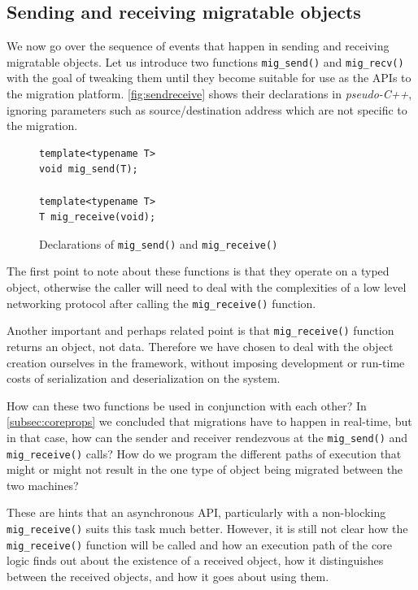 \subsection{Sending and receiving migratable objects}
\label{subsec:sendrecmig}

We now go over the sequence of events that happen in sending and
receiving migratable objects. Let us introduce two functions
\texttt{mig\_send()} and \texttt{mig\_recv()} with
the goal of tweaking them until they become suitable for use as the APIs
to the migration platform. \autoref{fig:sendreceive} shows their
declarations in \emph{pseudo-C++}, ignoring parameters such as
source/destination address which are not specific to the migration.

\begin{figure}[t]
\begin{lstlisting}
template<typename T>
void mig_send(T);

template<typename T>
T mig_receive(void);
\end{lstlisting}
\caption{
    Declarations of \texttt{mig\_send()} and \texttt{mig\_receive()}
}
\label{fig:sendreceive}
\end{figure}

The first point to note about these functions is that they operate on
a typed object, otherwise the caller will need to deal with the complexities
of a low level networking protocol after calling the \texttt{mig\_receive()}
function.

Another important and perhaps related point is that \texttt{mig\_receive()}
function returns an object, not data. Therefore we have chosen to
deal with the object creation ourselves in the framework, without imposing
development or run-time costs of serialization and deserialization on the
system.

How can these two functions be used in conjunction with each other?
In \autoref{subsec:coreprops} we concluded that migrations have to happen in
real-time, but in that case, how can the
sender and receiver rendezvous at the \texttt{mig\_send()} and
\texttt{mig\_receive()} calls? How do we program the different paths of
execution that might or might not result in the one type of object being
migrated between the two machines?

These are hints that an asynchronous API, particularly with a non-blocking
\texttt{mig\_receive()} suits this task much better. However, it is still not clear
how the \texttt{mig\_receive()} function will be called and how an execution path
of the core logic finds out about the existence of a received object,
how it distinguishes between the received objects, and how it goes about using
them.

